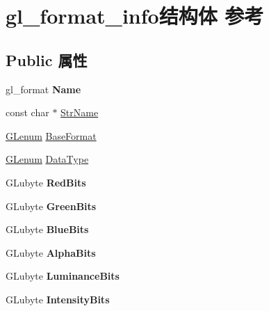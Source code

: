 \hypertarget{structgl__format__info}{}\section{gl\+\_\+format\+\_\+info结构体 参考}
\label{structgl__format__info}
\subsection*{Public 属性}
\begin{DoxyCompactItemize}
\item 
\mbox{\label{structgl__format__info_a177d83edc0f70f28f93e74680132b04d}} 
gl\+\_\+format {\bfseries Name}
\item 
const char $\ast$ \hyperlink{structgl__format__info_a35f344f7524df2b809ab6d5e07e4652c}{Str\+Name}
\item 
\hyperlink{interfacevoid}{G\+Lenum} \hyperlink{structgl__format__info_aa6d0320deffa06cbe0b6ffcca460fcb4}{Base\+Format}
\item 
\hyperlink{interfacevoid}{G\+Lenum} \hyperlink{structgl__format__info_acd2c92774e8b7f897b9c80672492eb75}{Data\+Type}
\item 
\mbox{\label{structgl__format__info_aab4bea427dce84ed158a119f27831316}} 
G\+Lubyte {\bfseries Red\+Bits}
\item 
\mbox{\label{structgl__format__info_aaf4f3212b330809b443243914f8336d2}} 
G\+Lubyte {\bfseries Green\+Bits}
\item 
\mbox{\label{structgl__format__info_a85ed636c67fc2d298b6ae520e88ed40f}} 
G\+Lubyte {\bfseries Blue\+Bits}
\item 
\mbox{\label{structgl__format__info_afba9651d530facbff70922ceb050be13}} 
G\+Lubyte {\bfseries Alpha\+Bits}
\item 
\mbox{\label{structgl__format__info_a16378bb20722b640cb90129fc54c2a97}} 
G\+Lubyte {\bfseries Luminance\+Bits}
\item 
\mbox{\label{structgl__format__info_a5939b02f2f39addba3d01b8f73e2635f}} 
G\+Lubyte {\bfseries Intensity\+Bits}

\end{DoxyCompactItemize}
